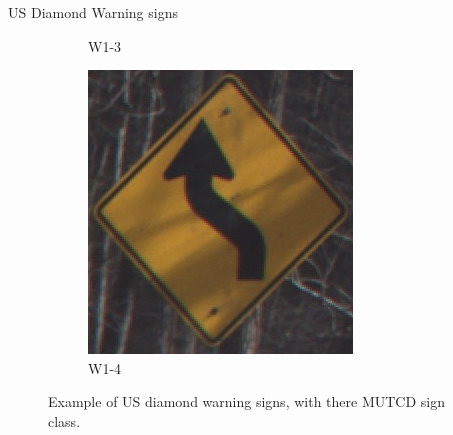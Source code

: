 \documentclass{beamer}
\begin{document}
\begin{frame}{US Diamond Warning signs}
\begin{figure}
\begin{center}
\begin{subfigure}[t]{.3\linewidth}
          \caption{W1-3}
        \end{subfigure}
        \begin{subfigure}[t]{.3\linewidth}
          \centering
          \includegraphics[height=0.8\linewidth]{figures/W1-4_L.jpg}
          \caption{W1-4}
        \end{subfigure}
        \caption{Example of US diamond warning signs, with there MUTCD sign class.}
        \label{signExample}
      \end{center}
    \end{figure}
\end{frame}{}
\end{document}
